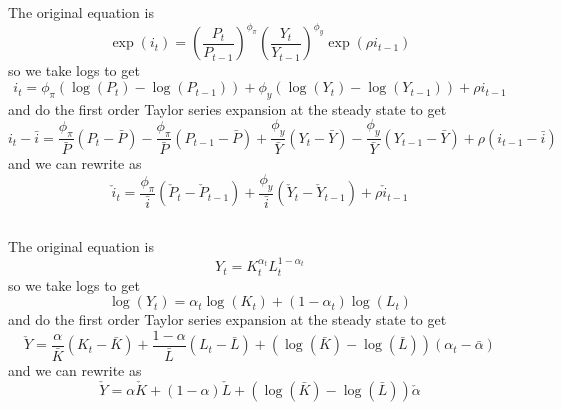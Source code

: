 \documentclass[11pt]{amsart}
\begin{document}
\subsection{}

\subsection{}
The original equation is
\[
\exp(i_t) = \left(\frac{P_t}{P_{t-1}} \right)^{\phi_{\pi}} \left(\frac{Y_t}{Y_{t-1}} \right)^{\phi_y} \exp(\rho i_{t-1})
\]
so we take logs to get
\[
i_t = \phi_{\pi}(\log(P_t) - \log(P_{t-1})) + \phi_y (\log(Y_t) - \log(Y_{t-1})) + \rho i_{t-1}
\]
and do the first order Taylor series expansion at the steady state to get
\[
i_t - \bar{i} = \frac{\phi_{\pi}}{\bar{P}} (P_t - \bar{P}) - \frac{\phi_{\pi}}{\bar{P}} (P_{t-1} - \bar{P}) +\frac{\phi_y}{\bar{Y}} (Y_t - \bar{Y}) - \frac{\phi_y}{\bar{Y}} (Y_{t-1} - \bar{Y}) + \rho(i_{t-1} - \bar{i})
\]
and we can rewrite as
\[
\check{i}_t = \frac{\phi_{\pi}}{\bar{i}} (\check{P}_t - \check{P}_{t-1})  +\frac{\phi_y}{\bar{i}} (\check{Y}_t - \check{Y}_{t-1}) + \rho \check{i}_{t-1}
\]

\subsection{}

\subsection{}
The original equation is
\[
Y_t = K_t^{\alpha_t} L_t^{1-\alpha_t}
\]
so we take logs to get
\[
\log(Y_t) = \alpha_t \log(K_t) + (1-\alpha_t) \log(L_t)
\]
and do the first order Taylor series expansion at the steady state to get
\[
\check{Y} =  \frac{\alpha }{\bar{K}} (K_t - \bar{K}) + \frac{1-\alpha }{\bar{L}} (L_t - \bar{L}) + (\log(\bar{K}) - \log(\bar{L})) (\alpha_t - \bar{\alpha})
\]
and we can rewrite as
\[
\check{Y} = \alpha \check{K} + (1-\alpha) \check{L} + (\log(\bar{K}) - \log(\bar{L})) \check{\alpha}
\]
\end{document}
